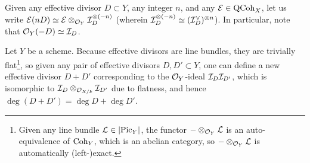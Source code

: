         \begin{convention}
            Given any effective divisor $D \subset Y$, any integer $n$, and any $\mathcal{E} \in \mathrm{QCoh}_X$, let us write $\E(nD) \cong \E \tensor_{\calO_Y} \calI_D^{\tensor (-n)}$ (wherein $\calI_D^{\tensor (-n)} \cong (\calI_D^{\vee})^{\tensor n}$). In particular, note that $\mathcal{O}_Y(-D) \simeq \mathcal{I}_D$.
        \end{convention}
        \begin{remark} \label{remark: adding_effective_divisors}
            Let $Y$ be a scheme. Because effective divisors are line bundles, they are trivially flat\footnote{Given any line bundle $\mathcal{L} \in |\mathrm{Pic}_Y|$, the functor $- \tensor_{\calO_Y} \calL$ is an auto-equivalence of $\mathrm{Coh}_Y$, which is an abelian category, so $- \tensor_{\calO_Y} \calL$ is automatically (left-)exact.}, so given any pair of effective divisors $D, D' \subset Y$, one can define a new effective divisor $D + D'$ corresponding to the $\mathcal{O}_Y$-ideal $\mathcal{I}_D \mathcal{I}_{D'}$, which is isomorphic to $\calI_D \tensor_{\calO_{X/k}} \calI_{D'}$ due to flatness, and hence $\deg(D + D') = \deg D + \deg D'$.
        \end{remark}
        
